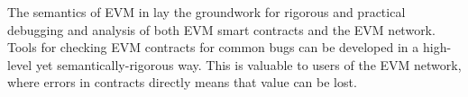 The semantics of EVM in \K{} lay the groundwork for rigorous and practical
debugging and analysis of both EVM smart contracts and the EVM network. Tools
for checking EVM contracts for common bugs can be developed in a high-level yet
semantically-rigorous way. This is valuable to users of the EVM network, where
errors in contracts directly means that value can be lost.

